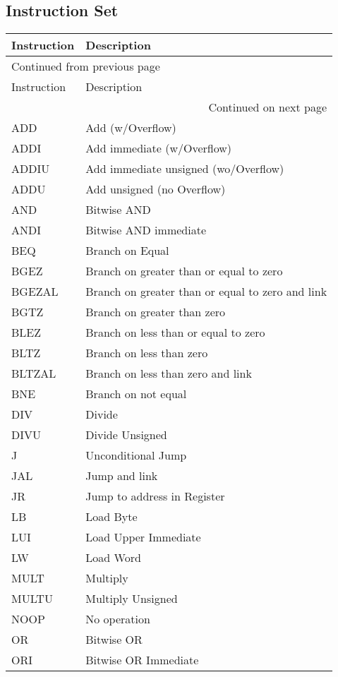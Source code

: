 \documentclass[11pt]{article}
\begin{document}
\subsection{Instruction Set}
\label{sec:org30d86e3}
\begin{longtable}{l|l}
Instruction & Description\\
\hline
\endfirsthead
\multicolumn{2}{l}{Continued from previous page} \\
\hline

Instruction & Description \\

\hline
\endhead
\hline\multicolumn{2}{r}{Continued on next page} \\
\endfoot
\endlastfoot
\hline
ADD & Add (w/Overflow)\\
ADDI & Add immediate (w/Overflow)\\
ADDIU & Add immediate unsigned (wo/Overflow)\\
ADDU & Add unsigned (no Overflow)\\
AND & Bitwise AND\\
ANDI & Bitwise AND immediate\\
BEQ & Branch on Equal\\
BGEZ & Branch on greater than or equal to zero\\
BGEZAL & Branch on greater than or equal to zero and link\\
BGTZ & Branch on greater than zero\\
BLEZ & Branch on less than or equal to zero\\
BLTZ & Branch on less than zero\\
BLTZAL & Branch on less than zero and link\\
BNE & Branch on not equal\\
DIV & Divide\\
DIVU & Divide Unsigned\\
J & Unconditional Jump\\
JAL & Jump and link\\
JR & Jump to address in Register\\
LB & Load Byte\\
LUI & Load Upper Immediate\\
LW & Load Word\\
MULT & Multiply\\
MULTU & Multiply Unsigned\\
NOOP & No operation\\
OR & Bitwise OR\\
ORI & Bitwise OR Immediate\\

\end{longtable}
\end{document}
